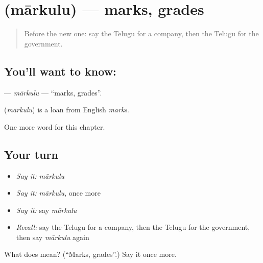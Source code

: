 \section[\texorpdfstring{\te{మార్కులు} (mārkulu)}{మార్కులు (mārkulu)}]{ (mārkulu) — marks, grades}

\label{lesson:TE-C236-markulu}



\begin{quote}
Before the new one: say the Telugu for a company, then the Telugu for the government.
\end{quote}

\subsection*{You'll want to know: }
\textbf{} — \emph{mārkulu} — \textquotedblleft{}marks, grades\textquotedblright{}.

\begin{cousinweb}
\textbf{} (\emph{mārkulu}) is a loan from English \emph{marks}.
\end{cousinweb}

\begin{grammarlens}[title={What you've built}]
One more word for this chapter.
\end{grammarlens}

\subsection*{Your turn}
\begin{itemize}
\raggedright
  \item \emph{Say it:} \emph{mārkulu}
  \item \emph{Say it:} \emph{mārkulu}, once more
  \item \emph{Say it:} say \emph{mārkulu}
  \item \emph{Recall:} say the Telugu for a company, then the Telugu for the government, then say \emph{mārkulu} again
\end{itemize}

\begin{tcolorbox}[breakable,colback=teal!4,colframe=teal!35!black,title={Before you move on}]
What does  mean? (\textquotedblleft{}Marks, grades\textquotedblright{}.) Say it once more.
\end{tcolorbox}
